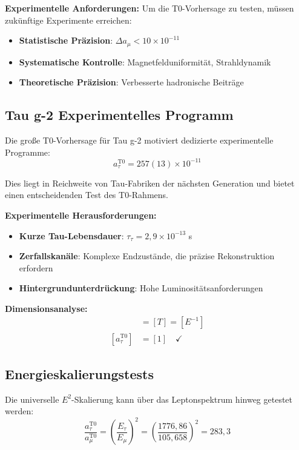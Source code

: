 \documentclass[12pt,a4paper]{report}
\begin{document}
	\textbf{Experimentelle Anforderungen:}
	Um die T0-Vorhersage zu testen, müssen zukünftige Experimente erreichen:
	\begin{itemize}
		\item \textbf{Statistische Präzision}: $\Delta a_\mu < 10 \times 10^{-11}$
		\item \textbf{Systematische Kontrolle}: Magnetfelduniformität, Strahldynamik
		\item \textbf{Theoretische Präzision}: Verbesserte hadronische Beiträge
	\end{itemize}
	
	\subsection{Tau g-2 Experimentelles Programm}
	\label{subsec:tau_g2_program}
	
	Die große T0-Vorhersage für Tau g-2 motiviert dedizierte experimentelle Programme:
	\begin{equation}
		a_\tau^{\text{T0}} = 257(13) \times 10^{-11}
	\end{equation}
	
	Dies liegt in Reichweite von Tau-Fabriken der nächsten Generation und bietet einen entscheidenden Test des T0-Rahmens.
	
	\textbf{Experimentelle Herausforderungen:}
	\begin{itemize}
		\item \textbf{Kurze Tau-Lebensdauer}: $\tau_\tau = 2,9 \times 10^{-13}$ s
		\item \textbf{Zerfallskanäle}: Komplexe Endzustände, die präzise Rekonstruktion erfordern
		\item \textbf{Hintergrundunterdrückung}: Hohe Luminositätsanforderungen
	\end{itemize}
	
	\textbf{Dimensionsanalyse:}
	\begin{align}
		[\tau_\tau] &= [T] = [E^{-1}] \\
		[a_\tau^{\text{T0}}] &= [1] \quad \checkmark
	\end{align}
	
	\subsection{Energieskalierungstests}
	\label{subsec:energy_scaling_tests}
	
	Die universelle $E^2$-Skalierung kann über das Leptonspektrum hinweg getestet werden:
	\begin{equation}
		\frac{a_\tau^{\text{T0}}}{a_\mu^{\text{T0}}} = \left(\frac{E_\tau}{E_\mu}\right)^2 = \left(\frac{1776,86}{105,658}\right)^2 = 283,3
	\end{equation}
	
\end{document}
